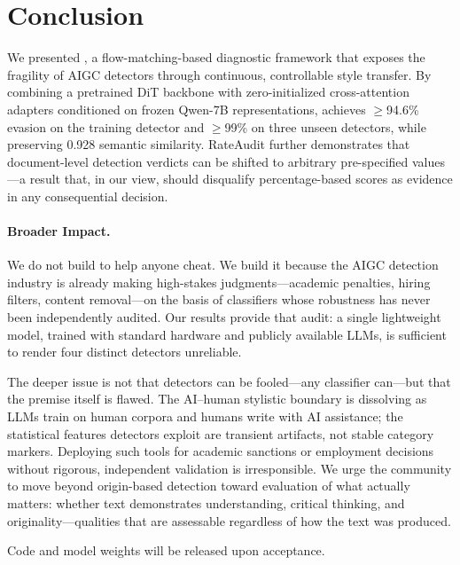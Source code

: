 \section{Conclusion}
\label{sec:conclusion}

We presented \styleshield{}, a flow-matching-based diagnostic framework that exposes the fragility of AIGC detectors through continuous, controllable style transfer.
By combining a pretrained DiT backbone with zero-initialized cross-attention adapters conditioned on frozen Qwen-7B representations, \styleshield{} achieves $\geq$94.6\% evasion on the training detector and $\geq$99\% on three unseen detectors, while preserving 0.928 semantic similarity.
RateAudit further demonstrates that document-level detection verdicts can be shifted to arbitrary pre-specified values---a result that, in our view, should disqualify percentage-based scores as evidence in any consequential decision.

\paragraph{Broader Impact.}
We do not build \styleshield{} to help anyone cheat.
We build it because the AIGC detection industry is already making high-stakes judgments---academic penalties, hiring filters, content removal---on the basis of classifiers whose robustness has never been independently audited.
Our results provide that audit: a single lightweight model, trained with standard hardware and publicly available LLMs, is sufficient to render four distinct detectors unreliable.

The deeper issue is not that detectors can be fooled---any classifier can---but that the premise itself is flawed.
The AI--human stylistic boundary is dissolving as LLMs train on human corpora and humans write with AI assistance; the statistical features detectors exploit are transient artifacts, not stable category markers.
Deploying such tools for academic sanctions or employment decisions without rigorous, independent validation is irresponsible.
We urge the community to move beyond origin-based detection toward evaluation of what actually matters: whether text demonstrates understanding, critical thinking, and originality---qualities that are assessable regardless of how the text was produced.

Code and model weights will be released upon acceptance.
